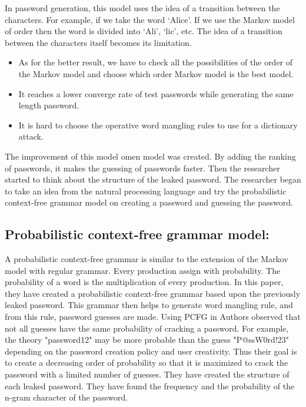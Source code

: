 \documentclass[runningheads]{llncs}
\newcommand{\singlequotes}[1]{`#1'}
\begin{document}
In password generation, this model uses the idea of a transition between the characters. For example, if we take the word \singlequotes{Alice}. If we use the Markov model of  order then the word is divided into \singlequotes{Ali}, \singlequotes{lic}, etc. The idea of a transition between the characters itself becomes its limitation.
\begin{itemize}
\item As for the better result, we have to check all the possibilities of the order of the Markov model and choose which order Markov model is the best model.\item It reaches a lower converge rate of test passwords while generating the same length password.  \item It is hard to choose the operative word mangling rules to use for a dictionary attack.
\end{itemize}The improvement of this model omen model\cite{10.1007/978-3-319-15618-7_10} was created. By adding the ranking of passwords, it makes the guessing of passwords faster.
Then the researcher started to think about the structure of the leaked password. The researcher began to take an idea from the natural processing language and try the probabilistic context-free grammar model\cite{5207658} on creating a password and guessing the password.
\\

\subsection{\textbf{Probabilistic context-free grammar model:}} 
\newline
A probabilistic context-free grammar is similar to the extension of the Markov model with regular grammar. Every production assign with probability. The probability of a word is the multiplication of every production. In this paper, they have created a probabilistic context-free grammar based upon the previously leaked password.
This grammar then helps to generate word mangling rule, and from this rule, password guesses are made.\cite{7098389} Using PCFG in \cite{5207658} Authors observed that not all guesses have the same probability of cracking a password. For example, the theory "password12" may be more probable than the guess "P@ssW0rd!23" depending on the password creation policy and user creativity. Thus their goal is to create a decreasing order of probability so that it is maximized to crack the password with a limited number of guesses. They have created the structure of each leaked password. They have found the frequency and the probability of the n-gram character of the password.
\newline
\\
\end{document}
